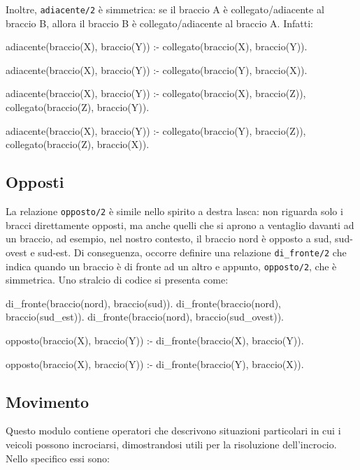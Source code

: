Inoltre, \texttt{adiacente/2} è simmetrica: se il braccio A è collegato/adiacente al braccio B, allora il braccio B è collegato/adiacente al braccio A. Infatti:

\begin{verbatimtab}
adiacente(braccio(X), braccio(Y)) :-
	collegato(braccio(X), braccio(Y)).

adiacente(braccio(X), braccio(Y)) :-
	collegato(braccio(Y), braccio(X)).

adiacente(braccio(X), braccio(Y)) :-
	collegato(braccio(X), braccio(Z)),
	collegato(braccio(Z), braccio(Y)).

adiacente(braccio(X), braccio(Y)) :-
	collegato(braccio(Y), braccio(Z)),
	collegato(braccio(Z), braccio(X)).
\end{verbatimtab}

\subsection{Opposti}
La relazione \texttt{opposto/2} è simile nello spirito a destra lasca: non riguarda solo i bracci direttamente opposti, ma anche quelli che si aprono a ventaglio davanti ad un braccio, ad esempio, nel nostro contesto, il braccio nord è opposto a sud, sud-ovest e sud-est. Di conseguenza, occorre definire una relazione \texttt{di\_fronte/2} che indica quando un braccio è di fronte ad un altro e appunto, \texttt{opposto/2}, che è simmetrica. Uno stralcio di codice si presenta come:

\begin{verbatimtab}
di_fronte(braccio(nord), braccio(sud)).
di_fronte(braccio(nord), braccio(sud_est)).
di_fronte(braccio(nord), braccio(sud_ovest)).

opposto(braccio(X), braccio(Y)) :-
	di_fronte(braccio(X), braccio(Y)).

opposto(braccio(X), braccio(Y)) :-
	di_fronte(braccio(Y), braccio(X)).
\end{verbatimtab}

\subsection{Movimento}
\label{ssec:pos}
Questo modulo contiene operatori che descrivono situazioni particolari in cui i veicoli possono incrociarsi, dimostrandosi utili per la risoluzione dell'incrocio. Nello specifico essi sono:

